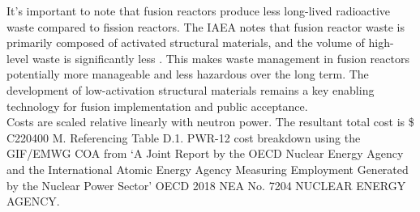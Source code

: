 It's important to note that fusion reactors produce less long-lived radioactive waste compared to fission reactors. The IAEA notes that fusion reactor waste is primarily composed of activated structural materials, and the volume of high-level waste is significantly less \cite{girard2008summary}. This makes waste management in fusion reactors potentially more manageable and less hazardous over the long term. The development of low-activation structural materials remains a key enabling technology for fusion implementation and public acceptance.\\

Costs are scaled relative linearly with neutron power. The resultant total cost is \$ C220400 M. Referencing Table D.1. PWR-12 cost breakdown using the GIF/EMWG COA from `A Joint Report by the OECD Nuclear Energy Agency and the International Atomic Energy Agency Measuring Employment Generated by the Nuclear Power Sector'  OECD 2018 NEA No. 7204 NUCLEAR ENERGY AGENCY.
